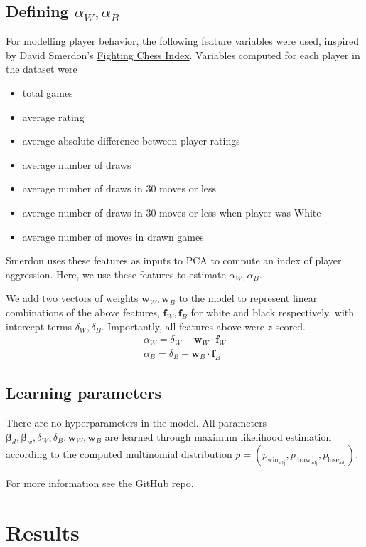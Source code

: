 \documentclass{article}
\begin{document}
\subsection{Defining $\alpha_W,\alpha_B$}
For modelling player behavior, the following feature variables were used, inspired by David Smerdon's
\href{https://www.davidsmerdon.com/?p=2168}{Fighting Chess Index}.
Variables computed for each player in the dataset were
\begin{itemize}
    \item total games
    \item average rating
    \item average absolute difference between player ratings
    \item average number of draws
    \item average number of draws in 30 moves or less
    \item average number of draws in 30 moves or less when player was White
    \item average number of moves in drawn games
\end{itemize}
Smerdon uses these features as inputs to PCA to compute an index of player aggression.
Here, we use these features to estimate $\alpha_W, \alpha_B$.

We add two vectors of weights $\bm{w}_W,\bm{w}_B$ to the model to represent
linear combinations of the above features, $\bm{f}_W,\bm{f}_B$ for white and black respectively, with
intercept terms $\delta_W,\delta_B$.
Importantly, all features above were $z$-scored.
\begin{gather*}
    \alpha_W=\delta_W + \bm{w}_W\cdot \bm{f}_W \\
    \alpha_B=\delta_B + \bm{w}_B\cdot \bm{f}_B
\end{gather*}

\subsection{Learning parameters}
There are no hyperparameters in the model. All parameters
$\bm{\beta}_d,\bm{\beta}_w, \delta_W, \delta_B,\bm{w}_W,\bm{w}_B$ are learned through maximum likelihood estimation
according to the computed multinomial distribution
$p=(p_{\text{win}_{\text{adj}}},p_{\text{draw}_{\text{adj}}},p_{\text{lose}_{\text{adj}}})$.

For more information see the GitHub repo.

\section{Results}
\end{document}
